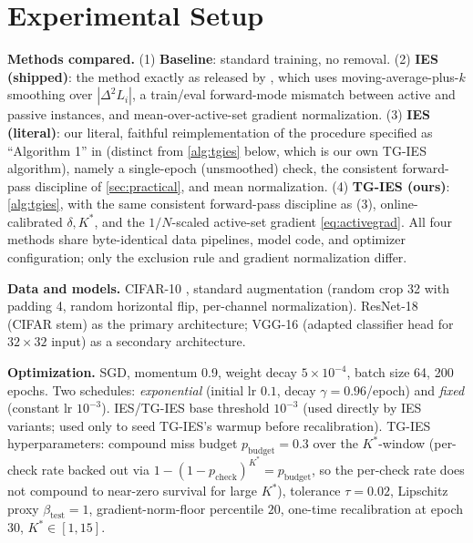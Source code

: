 \documentclass{article}
\theoremstyle{plain}
\theoremstyle{definition}
\theoremstyle{remark}
\begin{document}
\section{Experimental Setup}
\label{sec:setup}

\textbf{Methods compared.} (1) \textbf{Baseline}: standard training, no removal. (2) \textbf{IES (shipped)}: the method exactly as released by \citet{yuan2025instance}, which uses moving-average-plus-$k$ smoothing over $|\Delta^2 L_i|$, a train/eval forward-mode mismatch between active and passive instances, and mean-over-active-set gradient normalization. (3) \textbf{IES (literal)}: our literal, faithful reimplementation of the procedure specified as ``Algorithm 1'' in \citet{yuan2025instance} (distinct from \cref{alg:tgies} below, which is our own TG-IES algorithm), namely a single-epoch (unsmoothed) check, the consistent forward-pass discipline of \cref{sec:practical}, and mean normalization. (4) \textbf{TG-IES (ours)}: \cref{alg:tgies}, with the same consistent forward-pass discipline as (3), online-calibrated $\delta,K^*$, and the $1/N$-scaled active-set gradient \cref{eq:activegrad}. All four methods share byte-identical data pipelines, model code, and optimizer configuration; only the exclusion rule and gradient normalization differ.

\textbf{Data and models.} CIFAR-10 \citep{krizhevsky2009learning}, standard augmentation (random crop 32 with padding 4, random horizontal flip, per-channel normalization). ResNet-18 \citep{he2016deep} (CIFAR stem) as the primary architecture; VGG-16 \citep{simonyan2015very} (adapted classifier head for $32{\times}32$ input) as a secondary architecture.

\textbf{Optimization.} SGD, momentum 0.9, weight decay $5\times10^{-4}$, batch size 64, 200 epochs. Two schedules: \emph{exponential} (initial lr $0.1$, decay $\gamma=0.96$/epoch) and \emph{fixed} (constant lr $10^{-3}$). IES/TG-IES base threshold $10^{-3}$ (used directly by IES variants; used only to seed TG-IES's warmup before recalibration). TG-IES hyperparameters: compound miss budget $p_{\mathrm{budget}}=0.3$ over the $K^*$-window (per-check rate backed out via $1-(1-p_{\mathrm{check}})^{K^*}=p_{\mathrm{budget}}$, so the per-check rate does not compound to near-zero survival for large $K^*$), tolerance $\tau=0.02$, Lipschitz proxy $\beta_{\mathrm{test}}=1$, gradient-norm-floor percentile $20$, one-time recalibration at epoch 30, $K^*\in[1,15]$.
\end{document}
